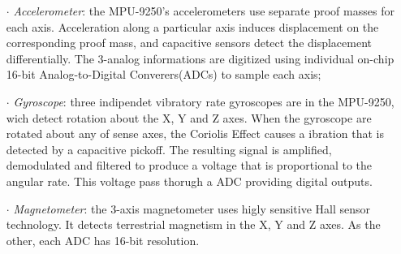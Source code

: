 \begin{itemize}
\item[$\cdot$] \textit{Accelerometer}: the MPU-9250's accelerometers use separate proof masses for each axis. Acceleration along a particular axis induces displacement on the corresponding proof mass, and capacitive sensors detect the displacement differentially. The 3-analog informations are digitized using individual on-chip 16-bit Analog-to-Digital Converers(ADCs) to sample each axis;

 \item[$\cdot$] \textit{Gyroscope}: three indipendet vibratory rate gyroscopes are in the MPU-9250, wich detect rotation about the X, Y and Z axes. When the gyroscope are rotated about any of sense axes, the Coriolis Effect causes a ibration that is detected by a capacitive pickoff. The resulting signal is amplified, demodulated and filtered to produce a voltage that is proportional to the angular rate. This voltage pass thorugh a ADC providing digital outputs.

 \item[$\cdot$] \textit{Magnetometer}: the 3-axis magnetometer uses higly sensitive Hall sensor technology. It detects terrestrial magnetism in the X, Y and Z axes. As the other, each ADC has 16-bit resolution. 
\end{itemize}


